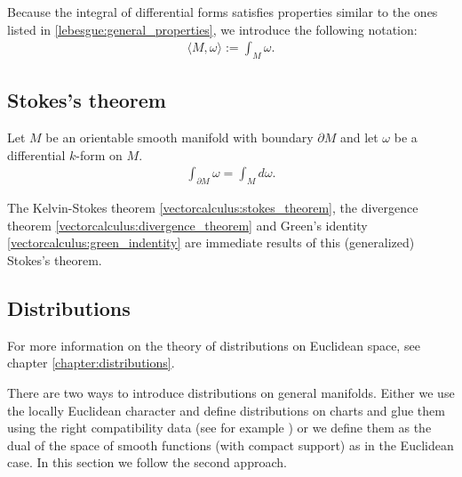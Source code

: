     \begin{notation}
        Because the integral of differential forms satisfies properties similar to the ones listed in \ref{lebesgue:general_properties}, we introduce the following notation:
        \begin{gather}
            \langle M, \omega \rangle := \int_M\omega.
        \end{gather}
    \end{notation}

\subsection{Stokes's theorem}

    \begin{theorem}
        \label{forms:theorem:stokes_theorem}
        Let $M$ be an orientable smooth manifold with boundary $\partial M$ and let $\omega$ be a differential $k$-form on $M$.
        \begin{gather}
            \int_{\partial M}\omega = \int_M d\omega.
        \end{gather}
    \end{theorem}
    \begin{result}
        The Kelvin-Stokes theorem \ref{vectorcalculus:stokes_theorem}, the divergence theorem \ref{vectorcalculus:divergence_theorem} and Green's identity \ref{vectorcalculus:green_indentity} are immediate results of this (generalized) Stokes's theorem.
    \end{result}

\subsection{Distributions}

    For more information on the theory of distributions on Euclidean space, see chapter \ref{chapter:distributions}.

    There are two ways to introduce distributions on general manifolds. Either we use the locally Euclidean character and define distributions on charts and glue them using the right compatibility data (see for example \cite{AMP1}) or we define them as the dual of the space of smooth functions (with compact support) as in the Euclidean case. In this section we follow the second approach.

